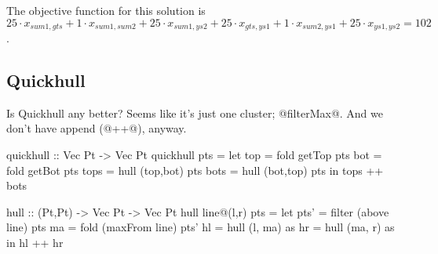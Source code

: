 The objective function for this solution is
$25 \cdot x_{sum1, gts} + 1 \cdot x_{sum1,sum2} + 25 \cdot x_{sum1, ys2} + 25 \cdot x_{gts, ys1} + 1 \cdot x_{sum2, ys1} + 25 \cdot x_{ys1, ys2} = 102$.


\subsection{Quickhull}
Is Quickhull any better? Seems like it's just one cluster; @filterMax@. And we don't have append (@++@), anyway.
\begin{code}
quickhull :: Vec Pt -> Vec Pt
quickhull pts
 = let top  = fold getTop pts
       bot  = fold getBot pts
       tops = hull (top,bot) pts
       bots = hull (bot,top) pts
   in  tops ++ bots

hull :: (Pt,Pt) -> Vec Pt -> Vec Pt
hull line@(l,r) pts
 = let pts' = filter (above   line) pts
       ma   = fold   (maxFrom line) pts'
       hl   = hull   (l, ma)        as
       hr   = hull   (ma, r)        as
   in  hl  ++ hr
\end{code}
